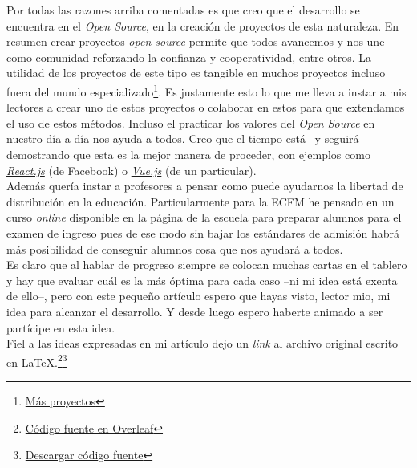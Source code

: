\documentclass{article}
\begin{document}
Por todas las razones arriba comentadas es que creo que el desarrollo se encuentra en el \textit{Open Source}, en la creación de proyectos de esta naturaleza. En resumen crear proyectos \textit{open source} permite que todos avancemos y nos une como comunidad reforzando la confianza y cooperatividad, entre otros. La utilidad de los proyectos de este tipo es tangible en muchos proyectos incluso fuera del mundo especializado\footnote{\href{https://www.redhat.com/en/open-source-stories}{Más proyectos}}. Es justamente esto lo que me lleva a instar a mis lectores a crear uno de estos proyectos o colaborar en estos para que extendamos el uso de estos métodos. Incluso el practicar los valores del \textit{Open Source} en nuestro día a día nos ayuda a todos. Creo que el tiempo está –y seguirá– demostrando que esta es la mejor manera de proceder, con ejemplos como \textit{\href{https://reactjs.org/}{React.js}} (de Facebook) o \textit{\href{https://vuejs.org/}{Vue.js}} (de un particular).\\

Además quería instar a profesores a pensar como puede ayudarnos la libertad de distribución en la educación. Particularmente para la ECFM he pensado en un curso \textit{online} disponible en la página de la escuela para preparar alumnos para el examen de ingreso pues de ese modo sin bajar los estándares de admisión habrá más posibilidad de conseguir alumnos cosa que nos ayudará a todos.\\

Es claro que al hablar de progreso siempre se colocan muchas cartas en el tablero y hay que evaluar cuál es la más óptima para cada caso –ni mi idea está exenta de ello–, pero con este pequeño artículo espero que hayas visto, lector mio, mi idea para alcanzar el desarrollo. Y desde luego espero haberte animado a ser partícipe en esta idea.\\

Fiel a las ideas expresadas en mi artículo dejo un \textit{link} al archivo original escrito en \LaTeX.\footnote{\href{https://www.overleaf.com/docs?snip_uri=https://amadocab.github.io/Intentopages/main.tex}{Código fuente en Overleaf}}\footnote{\href{https://amadocab.github.io/Intentopages/main.tex}{Descargar código fuente}}
\end{document}
